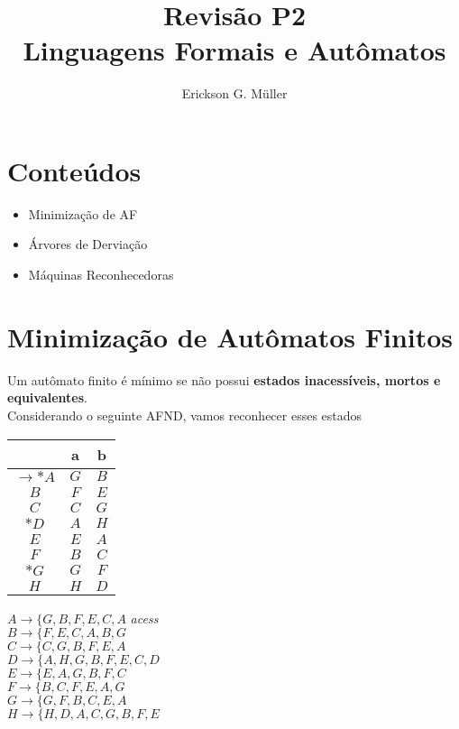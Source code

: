 \documentclass[]{article}
\title{Revisão P2\\Linguagens Formais e Autômatos}
\author{Erickson G. Müller}
\date{}
\begin{document}
\maketitle
\section*{Conteúdos}
	\begin{itemize}
		\item Minimização de AF
		\item Árvores de Derviação
		\item Máquinas Reconhecedoras
	\end{itemize}

\section{Minimização de Autômatos Finitos}
Um autômato finito é mínimo se não possui \textbf{estados inacessíveis, mortos e equivalentes}.\\
Considerando o seguinte AFND, vamos reconhecer esses estados\\
\begin{minipage}[t]{0.43\textwidth}
\centering
\begin{tabular}{|c|c|c|} %
            \toprule %
            & a & b \\
            \midrule %
		$\to *A $ & $G$ & $B$\\
		$B$ & $F$ & $E$\\
		$C$ & $C$ & $G$\\
		$*D$ & $A$ & $H$\\
		$E$ & $E$ & $A$\\
		$F$ & $B$ & $C$\\
		$*G$ & $G$ & $F$\\
		$H$ & $H$ & $D$\\
            \bottomrule %
        \end{tabular}
\end{minipage} 
\hfill
\begin{minipage}{0.43\textwidth}   
$A\to \{ G,B,F,E,C,A$ \textit{acess}\\
$B\to \{F,E,C,A,B,G$\\
$C\to \{C,G,B,F,E,A$\\
$D \to \{A,H,G,B,F,E,C,D$\\
$E \to \{ E,A,G,B,F,C$\\
$F\to \{ B,C,F,E,A,G$\\
$G\to \{ G,F,B,C,E,A$\\
$H \to \{ H,D,A,C,G,B,F,E$\\
\end{minipage}
    
\end{document}
